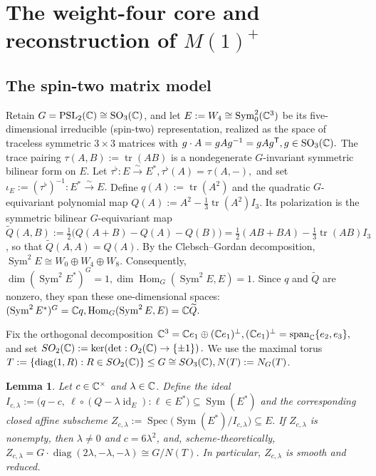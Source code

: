 \documentclass[10pt,a4paper]{amsart}
\numberwithin{equation}{section} \newtheorem{thm}{Theorem}[section] \newtheorem{lem}[thm]{Lemma} \newtheorem{ex}[thm]{Example} \newtheorem{prop}[thm]{Proposition} \newtheorem{cor}[thm]{Corollary} \newtheorem{defi}[thm]{Definition} \newtheorem{rmk}[thm]{Remark} \newtheorem{notation}[thm]{Notation}
\newcommand{\id}{\operatorname{id}}
\newcommand{\Sym}{\operatorname{Sym}}
\newcommand{\Spec}{\operatorname{Spec}}
\newcommand{\Hom}{\operatorname{Hom}}
\newcommand{\SO}{\operatorname{SO}}
\newcommand{\PSLtwo}{\operatorname{PSL}_2(\C)}
\begin{document}
\section{The weight-four core and reconstruction of \texorpdfstring{$M(1)^+$}{M(1)+}}\label{sec:weight4}

\subsection{The spin-two matrix model}

Retain \(G=\PSLtwo\cong\SO_3(\C)\), and let $ E:=W_4\cong\Sym^2_0(\C^3) $ be its five-dimensional irreducible (spin-two) representation, realized as the space of traceless symmetric \(3\times3\) matrices with $ g\cdot A=gAg^{-1}=gAg^{\mathsf T}, g\in \SO_3(\C). $ The trace pairing $ \tau(A,B):=\operatorname{tr}(AB) $ is a nondegenerate \(G\)-invariant symmetric bilinear form on \(E\). Let $\tau^\flat:E\overset{\sim}{\longrightarrow}E^*,\tau^\flat(A)=\tau(A,-),$ and set $ \iota_E:=(\tau^\flat)^{-1}:E^*\overset{\sim}{\longrightarrow}E. $ Define $ q(A):=\operatorname{tr}(A^2) $ and the quadratic \(G\)-equivariant polynomial map $ Q(A):=A^2-\frac13\operatorname{tr}(A^2)I_3. $ Its polarization is the symmetric bilinear \(G\)-equivariant map \(\widetilde Q(A,B):= \frac12\bigl(Q(A+B)-Q(A)-Q(B)\bigr) = \frac12(AB+BA)-\frac13\operatorname{tr}(AB)I_3\), so that \(\widetilde Q(A,A)=Q(A)\). By the Clebsch--Gordan decomposition, $ \Sym^2E\cong W_0\oplus W_4\oplus W_8. $ Consequently, $ \dim(\Sym^2E^*)^G=1, \dim\Hom_G(\Sym^2E,E)=1. $ Since \(q\) and \(\widetilde Q\) are nonzero, they span these one-dimensional spaces: $ (\Sym^2E^*)^G=\C q, \Hom_G(\Sym^2E,E)=\C\widetilde Q. $

Fix the orthogonal decomposition $\mathbb{C}^3=\mathbb{C} e_1\oplus (\mathbb{C} e_1)^\perp, (\mathbb{C} e_1)^\perp=\operatorname{span}_{\mathbb{C}}\{e_2,e_3\},$ and set \(SO_2(\mathbb{C}):=\ker\!\left(\det:O_2(\mathbb{C})\to\{\pm1\}\right).\) We use the maximal torus \(T:=\{\operatorname{diag}(1,R):R\in SO_2(\mathbb{C})\}\leq G\cong SO_3(\mathbb{C}), N(T):=N_G(T)\).

\begin{lem}\label{lem:quadratic-orbit}
Let $c\in\mathbb{C}^\times$ and $\lambda\in\mathbb{C}$. Define the ideal \(I_{c,\lambda}:=\bigl(q-c,\ \ell\circ(Q-\lambda\id_E):\ell\in E^*\bigr)\subseteq\Sym(E^*)\) and the corresponding closed affine subscheme \(Z_{c,\lambda}:=\Spec\bigl(\Sym(E^*)/I_{c,\lambda}\bigr)\subseteq E.\) If $Z_{c,\lambda}$ is nonempty, then \(\lambda\ne0\) and \(c=6\lambda^2\), and, scheme-theoretically, \(Z_{c,\lambda}=G\cdot\operatorname{diag}(2\lambda,-\lambda,-\lambda)\cong G/N(T)\). In particular, $Z_{c,\lambda}$ is smooth and reduced.
\end{lem}
\end{document}
